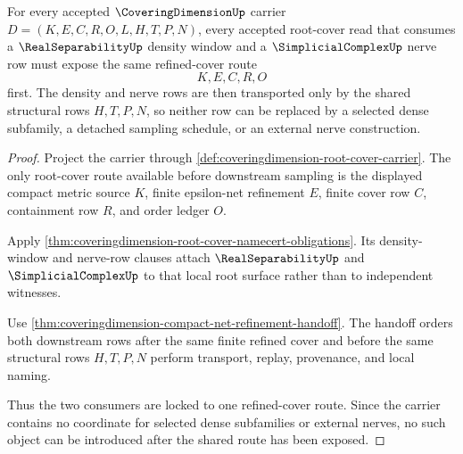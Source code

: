 \begin{theorem}
\label{thm:coveringdimension-root-cover-real-separability-simplicial-lock}
For every accepted $\CoveringDimensionUp$ carrier $D=(K,E,C,R,O,L,H,T,P,N)$, every accepted root-cover read that consumes a $\RealSeparabilityUp$ density window and a $\SimplicialComplexUp$ nerve row must expose the same refined-cover route
$$
K,E,C,R,O
$$
first. The density and nerve rows are then transported only by the shared structural rows $H,T,P,N$, so neither row can be replaced by a selected dense subfamily, a detached sampling schedule, or an external nerve construction.
\end{theorem}
\begin{proof}
Project the carrier through \autoref{def:coveringdimension-root-cover-carrier}. The only root-cover route available before downstream sampling is the displayed compact metric source $K$, finite epsilon-net refinement $E$, finite cover row $C$, containment row $R$, and order ledger $O$.

Apply \autoref{thm:coveringdimension-root-cover-namecert-obligations}. Its density-window and nerve-row clauses attach $\RealSeparabilityUp$ and $\SimplicialComplexUp$ to that local root surface rather than to independent witnesses.

Use \autoref{thm:coveringdimension-compact-net-refinement-handoff}. The handoff orders both downstream rows after the same finite refined cover and before the same structural rows $H,T,P,N$ perform transport, replay, provenance, and local naming.

Thus the two consumers are locked to one refined-cover route. Since the carrier contains no coordinate for selected dense subfamilies or external nerves, no such object can be introduced after the shared route has been exposed.
\end{proof}

